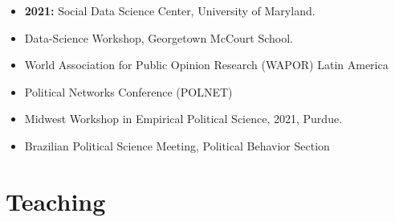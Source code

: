 \documentclass[letterpaper, 11pt]{article}
\begin{document}
\begin{itemize}[leftmargin=0cm, noitemsep]
    \item \textbf{2021:} \hspace{.02cm} Social Data Science Center, University of Maryland.
    \item \hspace{1.25cm}  Data-Science Workshop, Georgetown McCourt School.
    \item \hspace{1.25cm}  World Association for Public Opinion Research (WAPOR) Latin America
    \item \hspace{1.25cm} Political Networks Conference (POLNET)
    \item \hspace{1.25cm} Midwest Workshop in Empirical Political Science, 2021, Purdue.
   \item \hspace{1.25cm} Brazilian Political Science Meeting, Political Behavior Section
\end{itemize}




\section*{Teaching}
\end{document}
